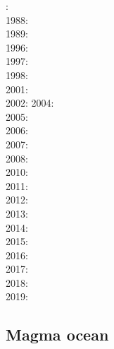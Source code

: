 {\scriptsize
{}: \cite{dagu86}\\
1988: \cite{hayu88}\\
1989: \cite{hayu89}\\
1996: \cite{boeh96}\\
1997: \cite{kell97}\\
1998: \cite{tack98b}\\
2001: \cite{soga01}\\
2002: \cite{somo02}\cite{tagh02}
2004: \cite{mczh04}\cite{nata04}\\
2005: \cite{mczh05a}\cite{nata05}\cite{nata05b}\\
2006: \cite{nata06}\\
2007: \cite{heta07}\cite{moyu07}\cite{pelt07}\cite{hibl07}\cite{yumc07}\\
2008: \cite{gamc08}\cite{nata08}\cite{stho08}\\
2010: \cite{stto10}\cite{mcgr10}\cite{nata10}\cite{vady10}\\
2011: \cite{bowg11}\cite{talz11}\cite{vayj11}\\
2012: \cite{stto12}\cite{dagd12}\cite{dect12}\\
2013: \cite{limc13}\cite{bogs13a}\cite{bogs13b}\\
2014: \cite{budt14}\cite{lidt14}\cite{tovd14}\\
2015: \cite{musd15}\cite{hafg15}\cite{delt15}\cite{wilm15}\\
2016: \cite{dost16}\cite{tosa16}\\
2017: \cite{hish17}\\
2018: \cite{daga18}\cite{lizo18}\cite{hect18}\\
2019: \cite{hebo19}\cite{rejv19}
}

\subsection{Magma ocean}

{\scriptsize
\noindent
\cite{elvh02}
\cite{hosh06}
\cite{devv10}
\cite{ullc12}
\cite{plth13}
\cite{maha15}
}

